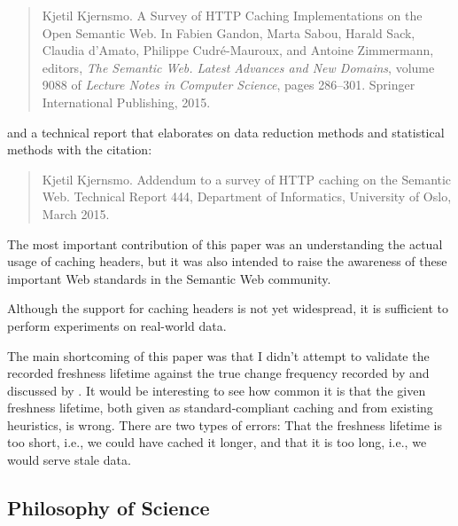 \begin{quote}
Kjetil Kjernsmo.
\newblock A Survey of HTTP Caching Implementations on the Open Semantic Web.
\Newblock In Fabien Gandon, Marta Sabou, Harald Sack, Claudia d’Amato,
  Philippe Cudré-Mauroux, and Antoine Zimmermann, editors, {\em The Semantic
  Web. Latest Advances and New Domains}, volume 9088 of {\em Lecture Notes in
  Computer Science}, pages 286--301. Springer International Publishing, 2015.
\end{quote}

and a technical report that elaborates on data reduction
methods and statistical methods with the citation:

\begin{quote}
Kjetil Kjernsmo.
\newblock Addendum to a survey of {HTTP} caching on the {Semantic Web}.
\newblock Technical Report 444, Department of Informatics, University of Oslo,
  March 2015.
\end{quote}

The most important contribution of this paper was an understanding the
actual usage of caching headers, but it was also intended to raise the
awareness of these important Web standards in the Semantic Web community.

Although the support for caching headers is not yet widespread, it is
sufficient to perform experiments on real-world data.

The main shortcoming of this paper was that I didn't attempt to
validate the recorded freshness lifetime against the true change
frequency recorded by \cite{dyldo2} and discussed by
\cite{Dividino2015}. It would be interesting to see how common it is
that the given freshness lifetime, both given as standard-compliant
caching and from existing heuristics, is wrong. There are two types of
errors: That the freshness lifetime is too short, i.e., we could have
cached it longer, and that it is too long, i.e., we would serve stale
data.

\subsection{Philosophy of Science}\label{sec:conphil}


